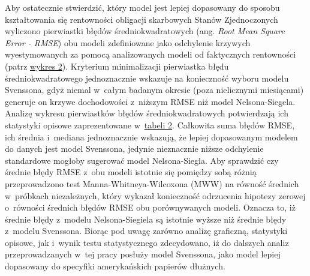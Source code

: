 Aby ostatecznie stwierdzić, który model jest lepiej dopasowany do sposobu kształtowania się rentowności obligacji skarbowych Stanów Zjednoczonych wyliczono pierwiastki błędów średniokwadratowych (ang. \textit{Root Mean Square Error - RMSE}) obu modeli zdefiniowane jako odchylenie krzywych wyestymowanych za pomocą analizowanych modeli od faktycznych rentowności (patrz \hyperlink{fig2}{wykres 2}). Kryterium minimalizacji pierwiastka błędu średniokwadratowego jednoznacznie wskazuje na konieczność wyboru modelu Svenssona, gdyż niemal w~całym badanym okresie (poza nielicznymi miesiącami) generuje on krzywe dochodowości z~niższym \acs{RMSE} niż model Nelsona-Siegela. Analizę wykresu pierwiastków błędów średniokwadratowych potwierdzają ich statystyki opisowe zaprezentowane w~\hyperlink{tab1}{tabeli 2}. Całkowita suma błędów \acs{RMSE}, ich średnia i~mediana jednoznacznie wskazują, że lepiej dopasowanym modelem do danych jest model Svenssona, jedynie nieznacznie niższe odchylenie standardowe mogłoby sugerować model Nelsona-Siegla. Aby sprawdzić czy średnie błędy \acs{RMSE} z~obu modeli istotnie się pomiędzy sobą różnią przeprowadzono test Manna-Whitneya-Wilcoxona (\acs{MWW}) na równość średnich w~próbkach niezależnych, który wykazał konieczność odrzucenia hipotezy zerowej o~równości średnich błędów \acs{RMSE} obu porównywanych modeli. Oznacza to, iż średnie błędy z~modelu Nelsona-Siegiela są istotnie wyższe niż średnie błędy z~modelu Svenssona. Biorąc pod uwagę zarówno analizę graficzną, statystyki opisowe, jak i~wynik testu statystycznego zdecydowano, iż do dalszych analiz przeprowadzanych w~tej pracy posłuży model Svenssona, jako model lepiej dopasowany do specyfiki amerykańskich papierów dłużnych. 

